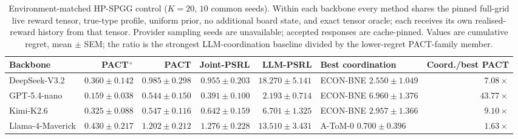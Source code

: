 \begin{table}[t]
\centering\scriptsize
\caption{Environment-matched HP-SPGG control ($K{=}20$, $10$ common seeds). Within each backbone every method shares the pinned full-grid live reward tensor, true-type profile, uniform prior, no additional board state, and exact tensor oracle; each receives its own realised-reward history from that tensor. Provider sampling seeds are unavailable; accepted responses are cache-pinned. Values are cumulative regret, mean $\pm$ SEM; the ratio is the strongest LLM-coordination baseline divided by the lower-regret PACT-family member.}
\label{tab:hp-spgg-matched}
\setlength{\tabcolsep}{3pt}
\begin{tabular}{lrrrrlr}
\toprule
Backbone & PACT$^+$ & PACT & Joint-PSRL & LLM-PSRL & Best coordination & Coord./best PACT \\
\midrule
DeepSeek-V3.2 & $0.360\pm0.142$ & $0.985\pm0.298$ & $0.955\pm0.203$ & $18.270\pm5.141$ & ECON-BNE $2.550\pm1.049$ & $7.08\times$ \\
GPT-5.4-nano & $0.159\pm0.038$ & $0.544\pm0.150$ & $0.391\pm0.100$ & $2.193\pm0.714$ & ECON-BNE $6.960\pm1.376$ & $43.77\times$ \\
Kimi-K2.6 & $0.325\pm0.088$ & $0.547\pm0.116$ & $0.642\pm0.159$ & $6.701\pm1.325$ & ECON-BNE $2.957\pm1.366$ & $9.10\times$ \\
Llama-4-Maverick & $0.430\pm0.217$ & $1.202\pm0.212$ & $1.276\pm0.228$ & $13.510\pm3.431$ & A-ToM-0 $0.700\pm0.396$ & $1.63\times$ \\
\bottomrule
\end{tabular}
\end{table}
